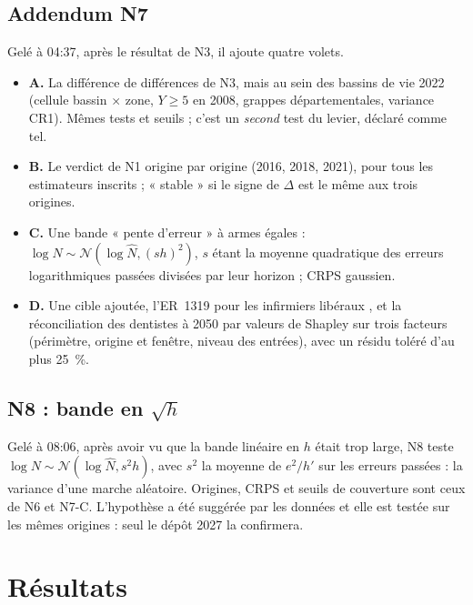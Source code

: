 \subsection{Addendum N7}
Gelé à 04:37, après le résultat de N3, il ajoute quatre volets.
\begin{itemize}
  \item \textbf{A.} La différence de différences de N3, mais au sein des bassins de vie 2022 (cellule
        bassin $\times$ zone, $Y \ge 5$\suppose{} en 2008, grappes départementales, variance CR1). Mêmes
        tests et seuils ; c'est un \emph{second} test du levier, déclaré comme tel.
  \item \textbf{B.} Le verdict de N1 origine par origine (2016, 2018, 2021), pour tous les estimateurs
        inscrits ; « stable » si le signe de $\Delta$ est le même aux trois origines.
  \item \textbf{C.} Une bande « pente d'erreur » à armes égales :
        $\log N \sim \mathcal N(\log \hat N, (s h)^2)$, $s$ étant la moyenne quadratique des erreurs
        logarithmiques passées divisées par leur horizon ; CRPS gaussien.
  \item \textbf{D.} Une cible ajoutée, l'ER~1319 pour les infirmiers libéraux \citep{a3-er1319}, et la
        réconciliation des dentistes à 2050 par valeurs de Shapley sur trois facteurs (périmètre,
        origine et fenêtre, niveau des entrées), avec un résidu toléré d'au plus 25\suppose{}~\%.
\end{itemize}

\subsection{N8 : bande en $\sqrt h$}
Gelé à 08:06, après avoir vu que la bande linéaire en $h$ était trop large, N8 teste
$\log N \sim \mathcal N(\log \hat N, s^2 h)$, avec $s^2$ la moyenne de $e^2/h'$ sur les erreurs passées :
la variance d'une marche aléatoire. Origines, CRPS et seuils de couverture sont ceux de N6 et N7-C.
L'hypothèse a été suggérée par les données et elle est testée sur les mêmes origines : seul le dépôt
2027 la confirmera.

\section{Résultats}\label{a3-sec:resultats}

